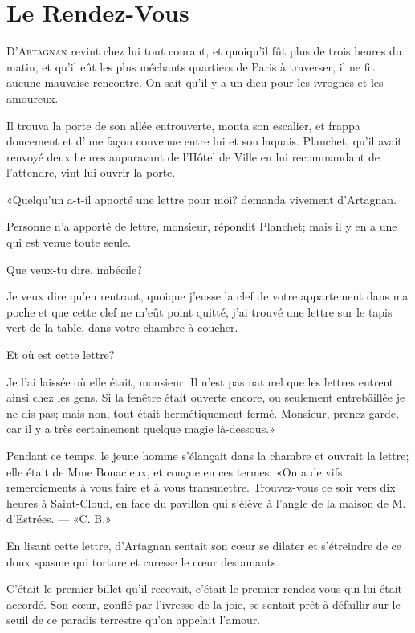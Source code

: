 
\chapter{Le Rendez-Vous} 
	
\lettrine{D}{'Artagnan} revint chez lui tout courant, et quoiqu'il fût plus de trois heures du matin, et qu'il eût les plus méchants quartiers de Paris à traverser, il ne fit aucune mauvaise rencontre. On sait qu'il y a un dieu pour les ivrognes et les amoureux. 

Il trouva la porte de son allée entrouverte, monta son escalier, et frappa doucement et d'une façon convenue entre lui et son laquais. Planchet, qu'il avait renvoyé deux heures auparavant de l'Hôtel de Ville en lui recommandant de l'attendre, vint lui ouvrir la porte. 

«Quelqu'un a-t-il apporté une lettre pour moi? demanda vivement d'Artagnan. 

\speak  Personne n'a apporté de lettre, monsieur, répondit Planchet; mais il y en a une qui est venue toute seule. 

\speak  Que veux-tu dire, imbécile? 

\speak  Je veux dire qu'en rentrant, quoique j'eusse la clef de votre appartement dans ma poche et que cette clef ne m'eût point quitté, j'ai trouvé une lettre sur le tapis vert de la table, dans votre chambre à coucher. 

\speak  Et où est cette lettre? 

\speak  Je l'ai laissée où elle était, monsieur. Il n'est pas naturel que les lettres entrent ainsi chez les gens. Si la fenêtre était ouverte encore, ou seulement entrebâillée je ne dis pas; mais non, tout était hermétiquement fermé. Monsieur, prenez garde, car il y a très certainement quelque magie là-dessous.» 

Pendant ce temps, le jeune homme s'élançait dans la chambre et ouvrait la lettre; elle était de Mme Bonacieux, et conçue en ces termes: «On a de vifs remerciements à vous faire et à vous transmettre. Trouvez-vous ce soir vers dix heures à Saint-Cloud, en face du pavillon qui s'élève à l'angle de la maison de M. d'Estrées. --- «C. B.» 

En lisant cette lettre, d'Artagnan sentait son cœur se dilater et s'étreindre de ce doux spasme qui torture et caresse le cœur des amants. 

C'était le premier billet qu'il recevait, c'était le premier rendez-vous qui lui était accordé. Son cœur, gonflé par l'ivresse de la joie, se sentait prêt à défaillir sur le seuil de ce paradis terrestre qu'on appelait l'amour. 

